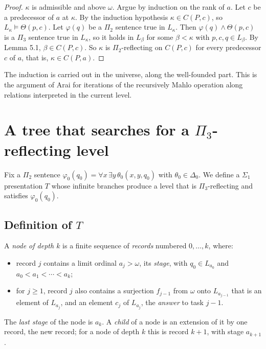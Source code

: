 \documentclass[11pt]{article}
\begin{document}
\begin{proof}
$\kappa$ is admissible and above $\omega$. Argue by induction on the rank of $a$. Let $c$ be a predecessor of $a$ at
$\kappa$. By the induction hypothesis $\kappa \in C(P, c)$, so $L_{\kappa} \models \Theta(p, c)$. Let $\varphi(q)$ be
a $\Pi_2$ sentence true in $L_{\kappa}$. Then $\varphi(q) \wedge \Theta(p, c)$ is a $\Pi_3$ sentence true in
$L_{\kappa}$, so it holds in $L_{\beta}$ for some $\beta < \kappa$ with $p, c, q \in L_{\beta}$. By Lemma 5.1,
$\beta \in C(P, c)$. So $\kappa$ is $\Pi_2$-reflecting on $C(P, c)$ for every predecessor $c$ of $a$, that is,
$\kappa \in C(P, a)$.
\end{proof}

The induction is carried out in the universe, along the well-founded part. This is the argument of Arai for
iterations of the recursively Mahlo operation along relations interpreted in the current level.

\section{A tree that searches for a $\Pi_3$-reflecting level}

Fix a $\Pi_2$ sentence $\varphi_0(q_0) = \forall x\, \exists y\, \theta_0(x, y, q_0)$ with $\theta_0 \in \Delta_0$. We
define a $\Sigma_1$ presentation $T$ whose infinite branches produce a level that is $\Pi_3$-reflecting and satisfies
$\varphi_0(q_0)$.

\subsection{Definition of $T$}

A \emph{node of depth $k$} is a finite sequence of \emph{records} numbered $0, \dots, k$, where:

\begin{itemize}
\item record $j$ contains a limit ordinal $a_j > \omega$, its \emph{stage}, with $q_0 \in L_{a_0}$ and
  $a_0 < a_1 < \cdots < a_k$;
\item for $j \ge 1$, record $j$ also contains a surjection $f_{j-1}$ from $\omega$ onto $L_{a_{j-1}}$ that is an element
  of $L_{a_j}$, and an element $c_j$ of $L_{a_j}$, the \emph{answer} to task $j-1$.
\end{itemize}

The \emph{last stage} of the node is $a_k$. A \emph{child} of a node is an
extension of it by one record, the new record; for a node of depth $k$ this is record $k+1$, with stage
$a_{k+1}$.
\end{document}
